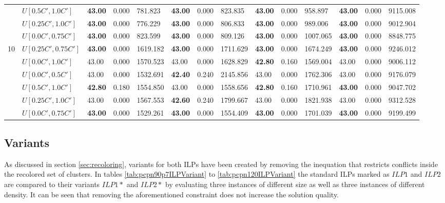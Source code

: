 \begin{table}[h]
{\begin{tabular}{|l|l||l|l|l||l|l|l||l|l|l||l|l|l|}
       & $U[0.5C',1.0C']$ & \textbf{43.00} & 0.000 & 781.823 & \textbf{43.00} & 0.000 & 823.835 	 & \textbf{43.00} & 0.000 & 958.897 & \textbf{43.00} & 0.000 & 9115.008\\
       & $U[0.25C',1.0C']$ & \textbf{43.00} & 0.000 & 776.229 & \textbf{43.00} & 0.000 & 806.833  & \textbf{43.00} & 0.000 & 989.006 & \textbf{43.00} & 0.000 & 9012.904\\
       & $U[0.0C',0.75C']$ & \textbf{43.00} & 0.000 & 823.599 & \textbf{43.00} & 0.000 & 809.126  & \textbf{43.00} & 0.000 & 1007.065 & \textbf{43.00} & 0.000 & 8848.775\\
      \hline\hline
      \multirow{6}{*}{10}
      & $U[0.25C',0.75C']$ & \textbf{43.00} & 0.000 & 1619.182 & \textbf{43.00} & 0.000 & 1711.629 	& \textbf{43.00} & 0.000 & 1674.249 & \textbf{43.00} & 0.000 & 9246.012\\
       & $U[0.0C',1.0C']$ & 43.00 & 0.000 & 1570.523 & 43.00 & 0.000 & 1628.829 	& \textbf{42.80} & 0.160 & 1569.004 & 43.00 & 0.000 & 9006.112\\
       & $U[0.0C',0.5C']$ & 43.00 & 0.000 & 1532.691 & \textbf{42.40} & 0.240 & 2145.856 		& 43.00 & 0.000 & 1762.306 & 43.00 & 0.000 & 9176.079\\
       & $U[0.5C',1.0C']$ & \textbf{42.80} & 0.180 & 1554.850 & 43.00 & 0.000 & 1558.656 	& \textbf{42.80} & 0.160 & 1710.961 & \textbf{43.00} & 0.000 & 9047.702\\
       & $U[0.25C',1.0C']$ & 43.00 & 0.000 & 1567.553 & \textbf{42.60} & 0.240 & 1799.667 	& 43.00 & 0.000 & 1821.938 & 43.00 & 0.000 & 9312.528\\
       & $U[0.0C',0.75C']$ & \textbf{43.00} & 0.000 & 1529.261 & \textbf{43.00} & 0.000 & 1554.409 	& \textbf{43.00} & 0.000 & 1701.039 & \textbf{43.00} & 0.000 & 9199.499\\
      \hline
      \end{tabular}
      }
      \label{tab:in4}\end{table}

\clearpage

\subsection{Variants}
As discussed in section \ref{sec:recoloring}, variants for both ILPs have been created by removing the inequation that restricts conflicts inside the recolored set of clusters. In tables \ref{tab:pcpn90p7ILPVariant} to \ref{tab:pcpn120ILPVariant} the standard ILPs marked as $ILP1$ and $ILP2$ are compared to their variants $ILP1*$ and $ILP2*$ by evaluating three instances of different size as well as three instances of different density. It can be seen that removing the aforementioned constraint does not increase the solution quality.\\


